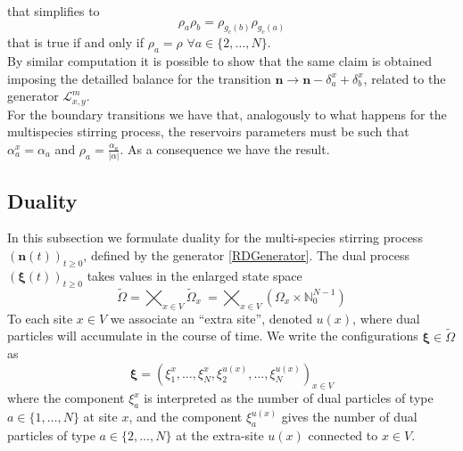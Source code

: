 \documentclass[10pt]{article}
\numberwithin{equation}{section}
\numberwithin{equation}{subsection}
\begin{document}
that simplifies to 
\begin{equation}
	\rho_{a}\rho_{b}=\rho_{g_{c}(b)}\rho_{g_{c}(a)}
\end{equation}
that is true if and only if $\rho_{a}=\rho$ $\forall a\in \{2,\ldots,N\}$.\\
By similar computation it is possible to show that the same claim is obtained imposing the detailled balance for the transition $\bm{n}\to \bm{n}-\delta_{a}^{x}+\delta_{b}^{x}$, related to the generator $\mathcal{L}^{m}_{x,y}$. \\
For the boundary transitions we have that, analogously to what happens for the multispecies stirring process, the reservoirs parameters must be such that $\alpha_{a}^{x}=\alpha_{a}$ and $\rho_{a}=\frac{\alpha_{a}}{|\alpha|}$. As a consequence we have the result. 
\subsection{Duality}
In this subsection we formulate duality for the multi-species stirring process $(\bm{n}(t))_{t\geq 0}$, defined by the generator \eqref{RDGenerator}.
The dual  process $(\bm{\xi}(t))_{t\geq 0}$ takes values in the enlarged state space
\begin{equation}
	\widetilde{\Omega}= \bigtimes_{x\in V} \widetilde{\Omega}_{x}\ = \bigtimes_{x\in V} (\Omega_{x}\times \mathbb{N}_{0}^{N-1})
\end{equation}
To each site $x\in V$ we associate an ``extra site'', denoted $u(x)$,
where dual particles will accumulate in the course of time. 
We write the configurations $\bm{\xi} \in \widetilde\Omega$  as
\begin{equation}
	\bm{\xi}=\left(\xi_{1}^{x},\ldots,\xi_{N}^{x},\xi_{2}^{u(x)},\ldots,\xi_{N}^{u(x)}\right)_{x\in V}
\end{equation}
where the component $\xi_{a}^{x}$ is interpreted as the number of dual particles of type $a\in \{1,\ldots,N\}$ at site $x$, 
and the component $\xi_{a}^{u(x)}$  gives the number of dual particles of type $a\in \{2,\ldots,N\}$ at 
the extra-site $u(x)$ connected to $x\in V$.
\end{document}
